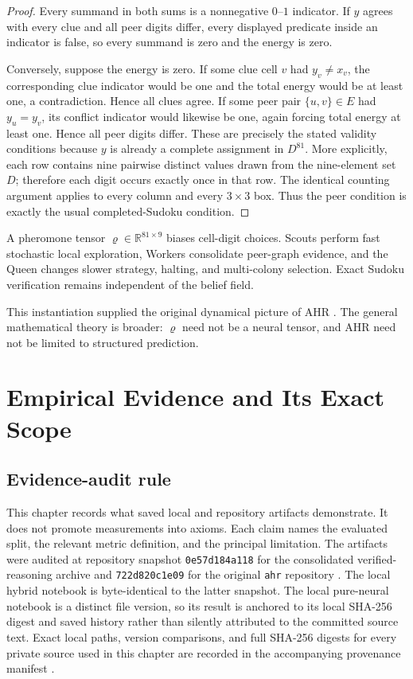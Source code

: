 \documentclass[11pt,oneside]{book}
\theoremstyle{remark}
\begin{document}
\begin{proof}
Every summand in both sums is a nonnegative $0$--$1$ indicator. If $y$
agrees with every clue and all peer digits differ, every displayed predicate
inside an indicator is false, so every summand is zero and the energy is
zero.

Conversely, suppose the energy is zero. If some clue cell $v$ had
$y_v\ne x_v$, the corresponding clue indicator would be one and the total
energy would be at least one, a contradiction. Hence all clues agree. If
some peer pair $\{u,v\}\in E$ had $y_u=y_v$, its conflict indicator would
likewise be one, again forcing total energy at least one. Hence all peer
digits differ. These are precisely the stated validity conditions because
$y$ is already a complete assignment in $D^{81}$. More explicitly, each row
contains nine pairwise distinct values drawn from the nine-element set $D$;
therefore each digit occurs exactly once in that row. The identical counting
argument applies to every column and every $3\times3$ box. Thus the peer
condition is exactly the usual completed-Sudoku condition.
\end{proof}

A pheromone tensor $\varrho\in\mathbb R^{81\times9}$ biases cell-digit
choices. Scouts perform fast stochastic local exploration, Workers consolidate
peer-graph evidence, and the Queen changes slower strategy, halting, and
multi-colony selection. Exact Sudoku verification remains independent of the
belief field.

This instantiation supplied the original dynamical picture of AHR
\cite{FalkenburgAHRDesign2026}. The general mathematical theory is broader:
$\varrho$ need not be a neural tensor, and AHR need not be limited to
structured prediction.

\chapter{Empirical Evidence and Its Exact Scope}

\section{Evidence-audit rule}

This chapter records what saved local and repository artifacts demonstrate.
It does not promote measurements into axioms. Each claim names the evaluated
split, the relevant metric definition, and the principal limitation. The
artifacts were audited at repository snapshot
\texttt{0e57d184a118} for the consolidated
verified-reasoning archive and
\texttt{722d820c1e09} for the original
\texttt{ahr} repository \cite{FalkenburgExperimentArchive2026,
FalkenburgSudokuNotebooks2026}. The local hybrid notebook is byte-identical to
the latter snapshot. The local pure-neural notebook is a distinct file
version, so its result is anchored to its local SHA-256 digest and saved
history rather than silently attributed to the committed source text. Exact
local paths, version comparisons, and full SHA-256 digests for every private
source used in this chapter are recorded in the accompanying provenance
manifest \cite{FalkenburgProvenanceManifest2026}.
\end{document}
